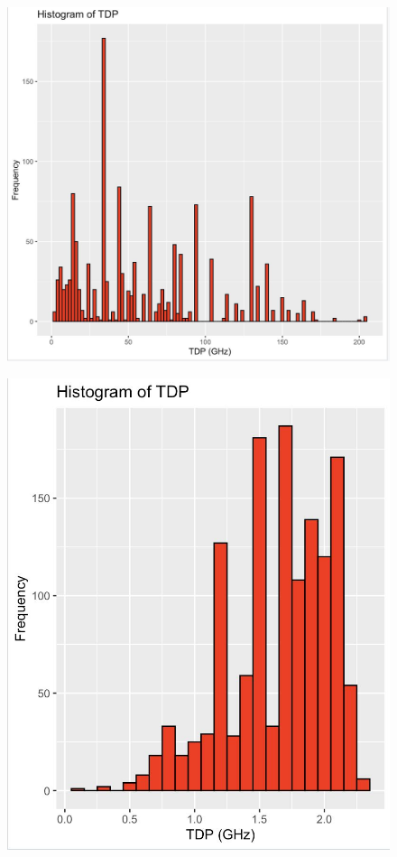 \begin{figure}[H]
    \begin{center}
    \includegraphics[width=14cm]{graphics/tdp_log_before.png}
    \end{center}
\end{figure}

\begin{figure}[H]
    \begin{center}
    \includegraphics[width=14cm]{graphics/tdp_log_after.png}
    \end{center}
\end{figure}

\newpage